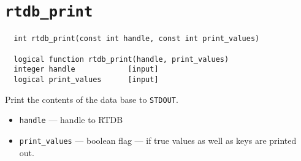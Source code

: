 \section{{\tt rtdb\_print}}
\begin{verbatim}
  int rtdb_print(const int handle, const int print_values)

  logical function rtdb_print(handle, print_values)
  integer handle            [input]
  logical print_values      [input]
\end{verbatim}
Print the contents of the data base to {\tt STDOUT}.
\begin{itemize}
\item {\tt handle} --- handle to RTDB
\item {\tt print\_values} --- boolean flag --- if true values as
  well as keys are printed out.
\end{itemize}
